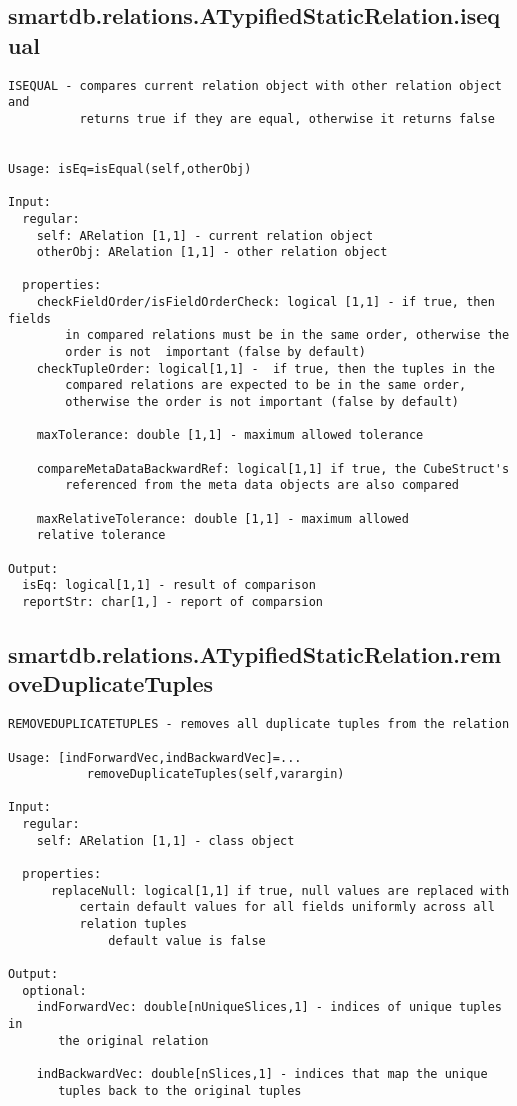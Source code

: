 \subsection{\texorpdfstring{smartdb.relations.ATypifiedStaticRelation.isequal}{isequal}}\label{method:smartdb.relations.ATypifiedStaticRelation.isequal}
\begin{verbatim}
ISEQUAL - compares current relation object with other relation object and
          returns true if they are equal, otherwise it returns false


Usage: isEq=isEqual(self,otherObj)

Input:
  regular:
    self: ARelation [1,1] - current relation object
    otherObj: ARelation [1,1] - other relation object

  properties:
    checkFieldOrder/isFieldOrderCheck: logical [1,1] - if true, then fields
        in compared relations must be in the same order, otherwise the
        order is not  important (false by default)
    checkTupleOrder: logical[1,1] -  if true, then the tuples in the
        compared relations are expected to be in the same order,
        otherwise the order is not important (false by default)

    maxTolerance: double [1,1] - maximum allowed tolerance

    compareMetaDataBackwardRef: logical[1,1] if true, the CubeStruct's
        referenced from the meta data objects are also compared

    maxRelativeTolerance: double [1,1] - maximum allowed
    relative tolerance

Output:
  isEq: logical[1,1] - result of comparison
  reportStr: char[1,] - report of comparsion
\end{verbatim}
\subsection{\texorpdfstring{smartdb.relations.ATypifiedStaticRelation.removeDuplicateTuples}{removeDuplicateTuples}}\label{method:smartdb.relations.ATypifiedStaticRelation.removeDuplicateTuples}
\begin{verbatim}
REMOVEDUPLICATETUPLES - removes all duplicate tuples from the relation

Usage: [indForwardVec,indBackwardVec]=...
           removeDuplicateTuples(self,varargin)

Input:
  regular:
    self: ARelation [1,1] - class object

  properties:
      replaceNull: logical[1,1] if true, null values are replaced with
          certain default values for all fields uniformly across all
          relation tuples
              default value is false

Output:
  optional:
    indForwardVec: double[nUniqueSlices,1] - indices of unique tuples in
       the original relation

    indBackwardVec: double[nSlices,1] - indices that map the unique
       tuples back to the original tuples
\end{verbatim}
